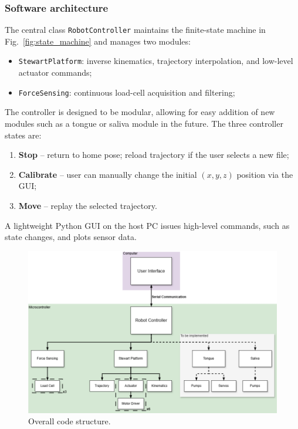 \subsubsection{Software architecture}
The central class \texttt{RobotController} maintains the finite-state machine in Fig.~\ref{fig:state_machine} and manages two
 modules:  
\begin{itemize}[nosep]
    \item \texttt{StewartPlatform}: inverse kinematics, trajectory interpolation, and low-level actuator commands;
    \item \texttt{ForceSensing}: continuous load-cell acquisition and filtering;
\end{itemize}
The controller is designed to be modular, allowing for easy addition of new modules such as a tongue or saliva module in the future.
The three controller states are:
\begin{enumerate}
    \item \textbf{Stop} – return to home pose; reload trajectory if the user selects a new file;
    \item \textbf{Calibrate} – user can manually change the initial $(x,y,z)$ position via the GUI;
    \item \textbf{Move} – replay the selected trajectory.
\end{enumerate}
A lightweight Python GUI on the host PC issues high-level commands, such as state changes, and plots sensor data.  

    

\begin{figure}[H]
\centering
\includegraphics[width=\textwidth]{figures/code_structure.drawio.png}
\caption{Overall code structure.}
\label{fig:code_structure}
\end{figure}


